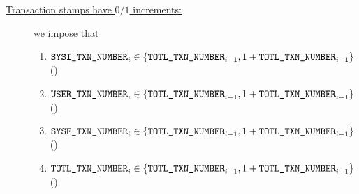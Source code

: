 \begin{description}
\[		\]
	\item[\underline{Transaction stamps have $0/1$ increments:}]
		we impose that
		\begin{enumerate}
			\item $\texttt{SYSI}\texttt{\_}\texttt{TXN\_NUMBER}  _{i} \in \{ \texttt{TOTL}\texttt{\_}\texttt{TXN\_NUMBER} _{i - 1}, 1 + \texttt{TOTL}\texttt{\_}\texttt{TXN\_NUMBER} _{i - 1} \}$ (\sanityCheck)
			\item $\texttt{USER}\texttt{\_}\texttt{TXN\_NUMBER}  _{i} \in \{ \texttt{TOTL}\texttt{\_}\texttt{TXN\_NUMBER} _{i - 1}, 1 + \texttt{TOTL}\texttt{\_}\texttt{TXN\_NUMBER} _{i - 1} \}$ (\sanityCheck)
			\item $\texttt{SYSF}\texttt{\_}\texttt{TXN\_NUMBER}  _{i} \in \{ \texttt{TOTL}\texttt{\_}\texttt{TXN\_NUMBER} _{i - 1}, 1 + \texttt{TOTL}\texttt{\_}\texttt{TXN\_NUMBER} _{i - 1} \}$ (\sanityCheck)
		        \item $\texttt{TOTL}\texttt{\_}\texttt{TXN\_NUMBER} _{i} \in \{ \texttt{TOTL}\texttt{\_}\texttt{TXN\_NUMBER} _{i - 1}, 1 + \texttt{TOTL}\texttt{\_}\texttt{TXN\_NUMBER} _{i - 1} \}$ (\sanityCheck)
		\end{enumerate}
\end{description}
